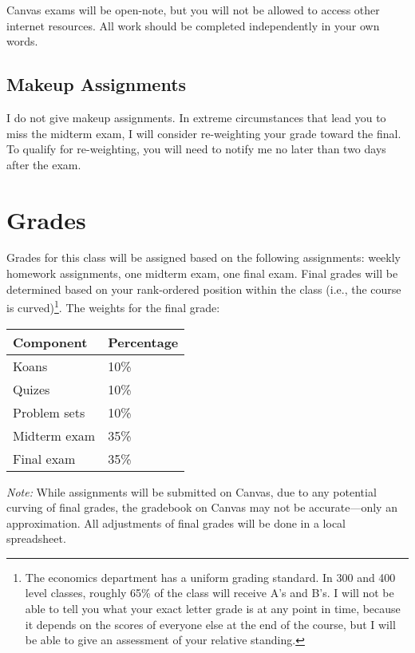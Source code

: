 \documentclass[
  letterpaper,
  DIV=11,
  numbers=noendperiod]{scrartcl}
\begin{document}
Canvas exams will be open-note, but you will not be allowed to access
other internet resources. All work should be completed independently in
your own words.

\subsection{Makeup Assignments}\label{makeup-assignments}

I do not give makeup assignments. In extreme circumstances that lead you
to miss the midterm exam, I will consider re-weighting your grade toward
the final. To qualify for re-weighting, you will need to notify me no
later than two days after the exam.

\clearpage

\section{Grades}\label{grades}

Grades for this class will be assigned based on the following
assignments: weekly homework assignments, one midterm exam, one final
exam. Final grades will be determined based on your rank-ordered
position within the class (i.e., the course is curved)\footnote{The
  economics department has a uniform grading standard. In 300 and 400
  level classes, roughly 65\% of the class will receive A's and B's. I
  will not be able to tell you what your exact letter grade is at any
  point in time, because it depends on the scores of everyone else at
  the end of the course, but I will be able to give an assessment of
  your relative standing.}. The weights for the final grade:

\begin{longtable}[]{@{}ll@{}}
\toprule\noalign{}
Component & Percentage \\
\midrule\noalign{}
\endhead
\bottomrule\noalign{}
\endlastfoot
Koans & 10\% \\
Quizes & 10\% \\
Problem sets & 10\% \\
Midterm exam & 35\% \\
Final exam & 35\% \\
\end{longtable}

\emph{Note:} While assignments will be submitted on Canvas, due to any
potential curving of final grades, the gradebook on Canvas may not be
accurate---only an approximation. All adjustments of final grades will
be done in a local spreadsheet.
\end{document}

